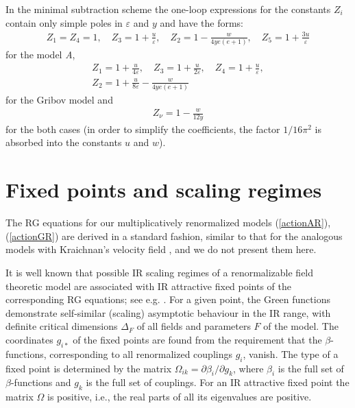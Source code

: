 \documentclass[12pt]{iopart}
\begin{document}
In the minimal subtraction scheme the one-loop expressions for the
constants $Z_{i}$ contain only simple poles in $\varepsilon$ and $y$
and have the forms:
\begin{eqnarray}
Z_{1} = Z_{4} = 1, \quad
Z_{3} = 1 + \frac{u}{\varepsilon}, \quad
Z_{2} = 1 - \frac{w}{4ye(e+1)} , \quad
Z_{5} = 1 + \frac{3u}{\varepsilon}
\label{ZoA}
\end{eqnarray}
for the model {\it A},
\begin{eqnarray}
Z_{1} = 1 + \frac{u}{4\varepsilon}, \quad
Z_{3} = 1 + \frac{u}{2\varepsilon}, \quad
Z_{4} = 1 + \frac{u}{\varepsilon},
\nonumber \\
Z_{2} = 1 + \frac{u}{8\varepsilon}- \frac{w}{4ye(e+1)}
\label{ZoG}
\end{eqnarray}
for the Gribov model and
\begin{eqnarray}
Z_{\nu} = 1 - \frac{w}{12y}
\label{ZoV}
\end{eqnarray}
for the both cases (in order to simplify the coefficients, the factor
$1/16\pi^2$ is absorbed into the constants $u$ and $w$).


\section{Fixed points and scaling regimes} \label{sec:FPS}

The RG equations for our multiplicatively renormalized models
(\ref{actionAR}), (\ref{actionGR}) are derived in a standard fashion,
similar to that for the analogous models with Kraichnan's velocity field
\cite{AIK}, and we do not present them here.

It is well known that possible IR scaling regimes of a renormalizable field
theoretic model are associated with IR attractive fixed points of the
corresponding RG equations; see e.g. \cite{Zinn,Book3}. For a given point,
the Green functions demonstrate self-similar (scaling) asymptotic behaviour
in the IR range, with definite critical dimensions $\Delta_{F}$ of all fields
and parameters $F$ of the model. The coordinates $g_{i*}$ of the fixed points
are found from the requirement that the $\beta$-functions, corresponding to
all renormalized couplings $g_{i}$, vanish. The type of a fixed point is
determined by the matrix $\Omega_{ik}=\partial\beta_{i}/\partial g_{k}$,
where $\beta_{i}$ is the full set of $\beta$-functions and $g_{k}$ is the
full set of couplings. For an IR attractive fixed point the matrix $\Omega$
is positive, i.e., the real parts of all its eigenvalues are positive.
\end{document}
